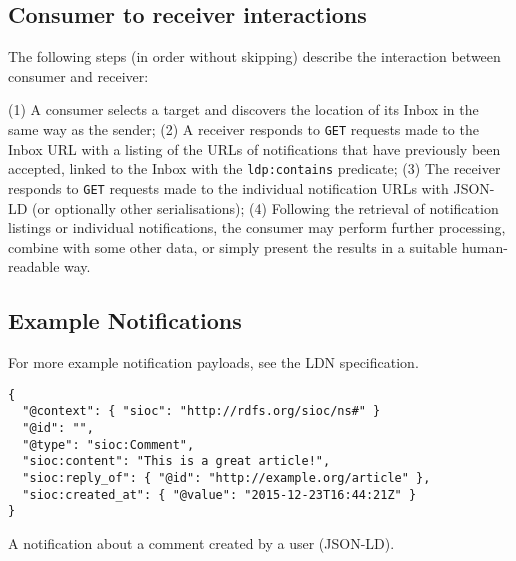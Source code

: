                             

                            
                                \subsection{Consumer to receiver interactions}
  \label{consumer-to-receiver}

                                
                                    
\par The following steps (in order without skipping) describe the interaction between consumer and receiver:

                                    
\par (1) A consumer selects a target and discovers the location of its Inbox in the same way as the sender; (2) A receiver responds to {\tt GET} requests made to the Inbox URL with a listing of the URLs of notifications that have previously been accepted, linked to the Inbox with the {\tt ldp:contains} predicate; (3) The receiver responds to {\tt GET} requests made to the individual notification URLs with JSON-LD (or optionally other serialisations); (4) Following the retrieval of notification listings or individual notifications, the consumer may perform further processing, combine with some other data, or simply present the results in a suitable human-readable way.
                                
                            

                            
                                \subsection{Example Notifications}
  \label{example-notifications}

                                
                                    
\par For more example notification payloads, see the \empty LDN specification.

                                    
                                        \begin{verbatim}{
  "@context": { "sioc": "http://rdfs.org/sioc/ns#" }
  "@id": "",
  "@type": "sioc:Comment",
  "sioc:content": "This is a great article!",
  "sioc:reply_of": { "@id": "http://example.org/article" },
  "sioc:created_at": { "@value": "2015-12-23T16:44:21Z" }
}\end{verbatim}
                                        A notification about a comment created by a user (JSON-LD).
                                    

